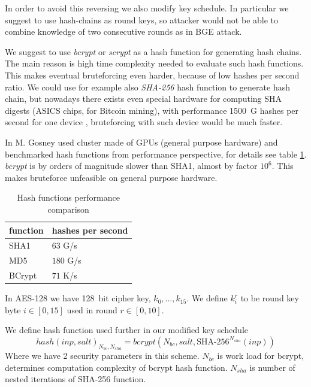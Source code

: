 \documentclass[11pt,oneside,final]{fithesis2}
\begin{document}
    In order to avoid this reversing we also modify key schedule.
    In particular we suggest to use hash-chains as round keys, so attacker would not be able to combine knowledge of two consecutive rounds as in BGE attack.
    
    We suggest to use \emph{bcrypt} \citep{Provos99afuture-adaptable} or \emph{scrypt} \citep{Percival_strongerkey} as a hash function for generating hash chains. The main reason is high time complexity needed to evaluate 
    such hash functions. This makes eventual bruteforcing even harder, because of low hashes per second ratio. We could
    use for example also \emph{SHA-256} hash function to generate hash chain, but nowadays there exists even special hardware for computing SHA digests 
    (ASICS chips, for Bitcoin mining), with performance 1500~G hashes per second for one device \cite{shamining_web}, bruteforcing with such device would be
    much faster. 
    
    In \cite{bcrypthash} M. Gosney used cluster made of GPUs (general purpose hardware) and benchmarked hash functions from performance perspective, for
    details see table \ref{tbl:hash_performance}. \emph{bcrypt} is by orders of magnitude slower than SHA1, almost by factor $10^6$. This makes bruteforce
    unfeasible on general purpose hardware. 

    \begin{table}
    \begin{center}
    \begin{tabular}{ l | l }
	function & hashes per second \\ \hline
	SHA1     & $63$ G/s \\ \hline
	MD5      & $180$ G/s \\ \hline
	BCrypt   & $71$ K/s \\   \hline
    \end{tabular}
    \caption{Hash functions performance comparison}
    \label{tbl:hash_performance}
    \end{center} 
    \end{table}
    
    In AES-128 we have 128~bit cipher key, $k_0,\dots,k_{15}$. We define $k_i^r$ to be round key byte $i \in [0,15]$ used in round $r \in [0,10]$.
    
    We define hash function used further in our modified key schedule
    \begin{equation}
	hash\left(inp, salt\right)_{N_{bc}, N_{sha}} = bcrypt\left(N_{bc}, salt, \text{SHA-}256^{N_{sha}}\left(inp\right)\right)
    \end{equation}
    Where we have 2 security parameters in this scheme.
    $N_{bc}$ is work load for bcrypt, determines computation complexity of bcrypt hash function. $N_{sha}$ is number of nested iterations of SHA-256 function. 
    
\end{document}

